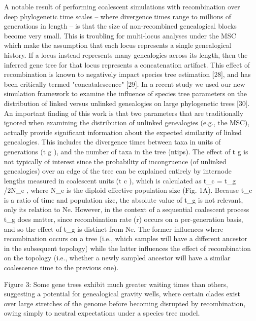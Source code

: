 \documentclass[12pt]{article}
\begin{document}
A notable result of performing coalescent simulations with recombination over deep 
phylogenetic time scales – where divergence times range to millions of generations 
in length – is that the size of non-recombined genealogical blocks become very small. 
This is troubling for multi-locus analyses under the MSC which make the assumption 
that each locus represents a single genealogical history. If a locus instead represents
many genealogies across its length, then the inferred gene tree for that locus 
represents a concatenation artifact.
This effect of recombination is known to negatively impact species tree estimation
[28], and has been critically termed "concatalescence" [29].
In a recent study we used our new simulation framework to examine the inﬂuence of 
species tree parameters on the distribution of linked versus unlinked genealogies 
on large phylogenetic trees [30]. An important ﬁnding of this work is that two 
parameters that are traditionally ignored when examining the distribution of 
unlinked genealogies (e.g., the MSC), actually provide signiﬁcant information about the
expected similarity of linked genealogies. This includes the divergence times 
between taxa in units of generations (t g ), and the number of taxa in the 
tree (ntips). The effect of t g is not typically of interest since the probability 
of incongruence (of unlinked genealogies) over an edge of the tree can be explained entirely
by internode lengths measured in coalescent units (t c ), which is calculated as 
t_c = t_g /2N_e , where N_e is the diploid effective population size (Fig. 1A). 
Because t_c is a ratio of time and population size, the absolute value of
t_g is not relevant, only its relation to Ne. However, in the context of a 
sequential coalescent process t_g does matter, since recombination rate (r) occurs 
on a per-generation basis, and so the effect of t_g is distinct from Ne. 
The former inﬂuences where recombination occurs on a tree (i.e., which samples 
will have a different ancestor in the subsequent topology) while the latter 
inﬂuences the effect of recombination on the topology (i.e., whether a newly sampled 
ancestor will have a similar coalescence time to the previous one).



Figure 3: Some gene trees exhibit much greater waiting times than others, suggesting a potential for genealogical gravity wells, where certain clades exist over large stretches of the genome before becoming disrupted by recombination, owing simply to neutral expectations under a species tree model.
\end{document}
